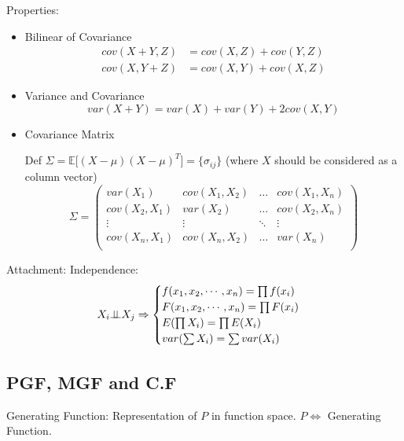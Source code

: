     Properties:
\begin{itemize}
\item Bilinear of Covariance\begin{align*}
    cov(X+Y,Z)&=cov(X,Z)+cov(Y,Z)\\
    cov(X,Y+Z)&=cov(X,Y)+cov(X,Z)
\end{align*}
    
\item Variance and Covariance
\begin{equation}\label{EqaVarOfSumOfRV}
    var(X+Y)=var(X)+var(Y)+2cov(X,Y)
\end{equation}
\item Covariance Matrix

    Def $\Sigma=\mathbb{E}\big[(X-\mu)(X-\mu)^T\big]=\{\sigma_{ij}\}$ (where $X$ should be considered as a column vector)
\begin{equation}\label{covariancematrix}
    \Sigma=
        \begin{pmatrix}
        var(X_1) & cov(X_1,X_2) & \ldots & cov(X_1,X_n)\\
        cov(X_2,X_1) & var(X_2) & \ldots & cov(X_2,X_n)\\
        \vdots & \vdots & \ddots & \vdots\\
        cov(X_n,X_1) & cov(X_n,X_2) & \ldots & var(X_n)\\
        \end{pmatrix}    
    \end{equation}
\end{itemize}

Attachment: Independence:\begin{equation}    X_i \bot\!\!\!\bot X_j\Rightarrow \begin{cases}
        f(x_1,x_2,\cdots,x_n)=\prod f(x_i)\\
        F(x_1,x_2,\cdots,x_n)=\prod F(x_i)\\
        E(\prod X_i)=\prod E(X_i)\\
        var(\sum X_i)=\sum var(X_i)
    \end{cases}
\end{equation}


\subsection{PGF, MGF and C.F}\label{SectionPGFMGFCF}

    Generating Function: Representation of $P$ in function space. $P\Leftrightarrow$ Generating Function.

